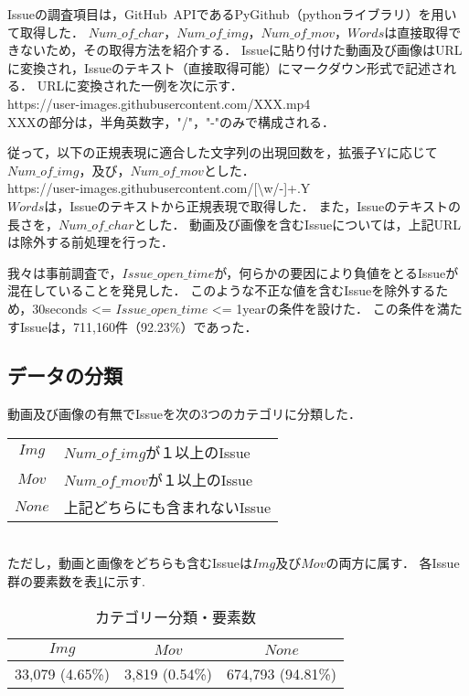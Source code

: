Issueの調査項目は，GitHub~APIであるPyGithub（pythonライブラリ）を用いて取得した．
$Num\_of\_char$，$Num\_of\_img$，$Num\_of\_mov$，$Words$は直接取得できないため，その取得方法を紹介する．
Issueに貼り付けた動画及び画像はURLに変換され，Issueのテキスト（直接取得可能）にマークダウン形式で記述される．
URLに変換された一例を次に示す．\\

https://user-images.githubusercontent.com/XXX.mp4 \\

XXXの部分は，半角英数字，"/"，"-"のみで構成される．

従って，以下の正規表現に適合した文字列の出現回数を，拡張子Yに応じて$Num\_of\_img$，及び，$Num\_of\_mov$とした．\\

https://user-images.githubusercontent.com/[\textbackslash w/-]+.Y \\

$Words$は，Issueのテキストから正規表現で取得した．
また，Issueのテキストの長さを，$Num\_of\_char$とした．
動画及び画像を含むIssueについては，上記URLは除外する前処理を行った．

我々は事前調査で，$Issue\_open\_time$が，何らかの要因により負値をとるIssueが混在していることを発見した．
このような不正な値を含むIssueを除外するため，30seconds <= $Issue\_open\_time$ <= 1yearの条件を設けた．
この条件を満たすIssueは，711,160件（92.23\%）であった．


\subsection{データの分類}
動画及び画像の有無でIssueを次の3つのカテゴリに分類した．\\

\begin{tabular}{c l}
    $Img$ & $Num\_of\_img$が１以上のIssue \\
    $Mov$ & $Num\_of\_mov$が１以上のIssue \\
    $None$ & 上記どちらにも含まれないIssue\\ 
\end{tabular} \\

ただし，動画と画像をどちらも含むIssueは$Img$及び$Mov$の両方に属す．
各Issue群の要素数を表\ref{classify_result}に示す. 

\begin{table}[h]
    \begin{center}
    \caption{カテゴリー分類・要素数}
    \begin{tabular}{c|c|c}
        \hline
        $Img$ & $Mov$ & $None$ \\ 
        \hline \hline
        33,079 (4.65\%) & 3,819 (0.54\%) & 674,793 (94.81\%) \\
        \hline
    \end{tabular}
    \label{classify_result}
    \end{center}
\end{table}


